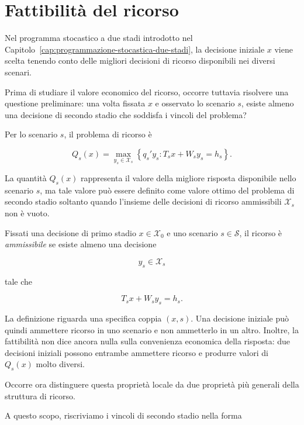 \section{Fattibilit\`a del ricorso}

\label{sec:cap15-fattibilita-ricorso-v2}

Nel programma stocastico a due stadi introdotto nel
Capitolo~\ref{cap:programmazione-stocastica-due-stadi}, la decisione iniziale
$x$ viene scelta tenendo conto delle migliori decisioni di ricorso disponibili
nei diversi scenari.

Prima di studiare il valore economico del ricorso, occorre tuttavia risolvere
una questione preliminare: una volta fissata $x$ e osservato lo scenario $s$,
esiste almeno una decisione di secondo stadio che soddisfa i vincoli del
problema?

Per lo scenario $s$, il problema di ricorso \`e

\[
Q_s(x)
=
\max_{y_s\in\mathcal X_s}
\left\{
q_s'y_s:
T_sx+W_sy_s=h_s
\right\}.
\]

La quantit\`a $Q_s(x)$ rappresenta il valore della migliore risposta
disponibile nello scenario $s$, ma tale valore pu\`o essere definito come
valore ottimo del problema di secondo stadio soltanto quando l'insieme delle
decisioni di ricorso ammissibili $\mathcal X_s$ non \`e vuoto.

\begin{definition}

Fissati una decisione di primo stadio $x\in\mathcal X_0$ e uno scenario
$s\in\mathcal S$, il ricorso \`e \emph{ammissibile} se esiste almeno una
decisione

\[
y_s\in\mathcal X_s
\]

\noindent tale che

\[
T_sx+W_sy_s=h_s.
\]

\end{definition}

La definizione riguarda una specifica coppia $(x,s)$. Una decisione iniziale
pu\`o quindi ammettere ricorso in uno scenario e non ammetterlo in un altro.
Inoltre, la fattibilit\`a non dice ancora nulla sulla convenienza economica
della risposta: due decisioni iniziali possono entrambe ammettere ricorso e
produrre valori di $Q_s(x)$ molto diversi.

Occorre ora distinguere questa propriet\`a locale da due propriet\`a pi\`u
generali della struttura di ricorso.


A questo scopo, riscriviamo i vincoli di secondo stadio
nella forma

